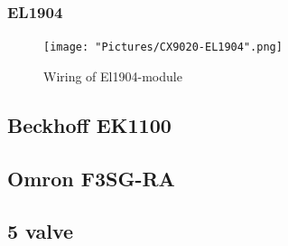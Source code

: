 \documentclass{article}
\begin{document}
    \subsubsection{EL1904}
    
    \begin{figure}[!h]
        \centering
        \texttt{[image: "Pictures/CX9020-EL1904".png]}
        \caption{Wiring of El1904-module}
    \end{figure}
    
    \newpage
    
    \subsection{Beckhoff EK1100}
    
    \newpage
    
    \subsection{Omron F3SG-RA}
    
    \newpage
    
    \subsection{5\2 valve}
    
    \newpage
    
    \subsection{}
    
    
        
\end{document}
